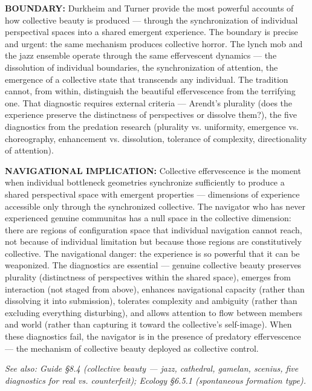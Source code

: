\textbf{BOUNDARY:} Durkheim and Turner provide the most powerful accounts of how collective beauty is produced — through the synchronization of individual perspectival spaces into a shared emergent experience. The boundary is precise and urgent: the same mechanism produces collective horror. The lynch mob and the jazz ensemble operate through the same effervescent dynamics — the dissolution of individual boundaries, the synchronization of attention, the emergence of a collective state that transcends any individual. The tradition cannot, from within, distinguish the beautiful effervescence from the terrifying one. That diagnostic requires external criteria — Arendt's plurality (does the experience preserve the distinctness of perspectives or dissolve them?), the five diagnostics from the predation research (plurality vs. uniformity, emergence vs. choreography, enhancement vs. dissolution, tolerance of complexity, directionality of attention).


\textbf{NAVIGATIONAL IMPLICATION:} Collective effervescence is the moment when individual bottleneck geometries synchronize sufficiently to produce a shared perspectival space with emergent properties — dimensions of experience accessible only through the synchronized collective. The navigator who has never experienced genuine communitas has a null space in the collective dimension: there are regions of configuration space that individual navigation cannot reach, not because of individual limitation but because those regions are constitutively collective. The navigational danger: the experience is so powerful that it can be weaponized. The diagnostics are essential — genuine collective beauty preserves plurality (distinctness of perspectives within the shared space), emerges from interaction (not staged from above), enhances navigational capacity (rather than dissolving it into submission), tolerates complexity and ambiguity (rather than excluding everything disturbing), and allows attention to flow between members and world (rather than capturing it toward the collective's self-image). When these diagnostics fail, the navigator is in the presence of predatory effervescence — the mechanism of collective beauty deployed as collective control.


\textit{See also: Guide §8.4 (collective beauty — jazz, cathedral, gamelan, scenius, five diagnostics for real vs. counterfeit); Ecology §6.5.1 (spontaneous formation type).}


\bigskip\noindent\makebox[\textwidth]{\color{rulegray}\rule{5cm}{0.3pt}}\bigskip


